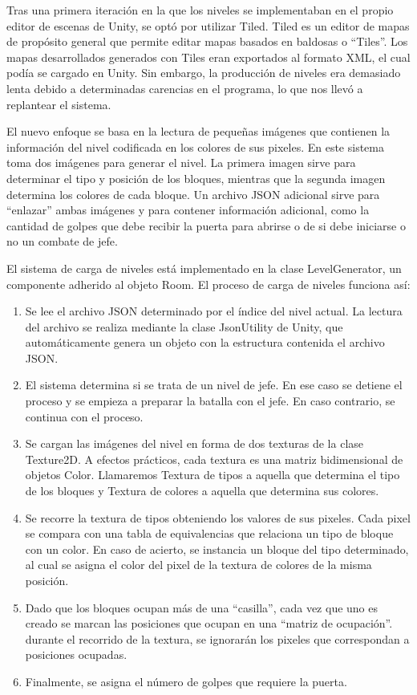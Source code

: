 Tras una primera iteración en la que los niveles se implementaban en el propio editor de escenas de Unity, se optó por utilizar Tiled. Tiled es un editor de mapas de propósito general que permite editar mapas basados en baldosas o ``Tiles''. Los mapas desarrollados generados con Tiles eran exportados al formato XML, el cual podía se cargado en Unity. Sin embargo, la producción de niveles era demasiado lenta debido a determinadas carencias en el programa, lo que nos llevó a replantear el sistema.

El nuevo enfoque se basa en la lectura de pequeñas imágenes que contienen la información del nivel codificada en los colores de sus pixeles. En este sistema toma dos imágenes para generar el nivel. La primera imagen sirve para determinar el tipo y posición de los bloques, mientras que la segunda imagen determina los colores de cada bloque. Un archivo JSON adicional sirve para ``enlazar'' ambas imágenes y para contener información adicional, como la cantidad de golpes que debe recibir la puerta para abrirse o de si debe iniciarse o no un combate de jefe.

El sistema de carga de niveles está implementado en la clase LevelGenerator, un componente adherido al objeto Room. El proceso de carga de niveles funciona así:
\begin{enumerate}
  \item Se lee el archivo JSON determinado por el índice del nivel actual. La lectura del archivo se realiza mediante la clase JsonUtility de Unity, que automáticamente genera un objeto con la estructura contenida el archivo JSON.
  \item El sistema determina si se trata de un nivel de jefe. En ese caso se detiene el proceso y se empieza a preparar la batalla con el jefe. En caso contrario, se continua con el proceso.
  \item Se cargan las imágenes del nivel en forma de dos texturas de la clase Texture2D. A efectos prácticos, cada textura es una matriz bidimensional de objetos Color. Llamaremos Textura de tipos a aquella que determina el tipo de los bloques y Textura de colores a aquella que determina sus colores.
  \item Se recorre la textura de tipos obteniendo los valores de sus pixeles. Cada pixel se compara con una tabla de equivalencias que relaciona un tipo de bloque con un color. En caso de acierto, se instancia un bloque del tipo determinado, al cual se asigna el color del pixel de la textura de colores de la misma posición.
  \item Dado que los bloques ocupan más de una ``casilla'', cada vez que uno es creado se marcan las posiciones que ocupan en una ``matriz de ocupación''. durante el recorrido de la textura, se ignorarán los pixeles que correspondan a posiciones ocupadas.
  \item Finalmente, se asigna el número de golpes que requiere la puerta.
\end{enumerate}

